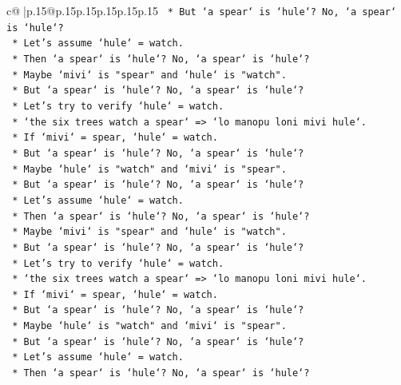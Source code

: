 \documentclass{article}
\begin{document}
{\begin{supertabular}{c@{$\;$}|p{.15\linewidth}@{}p{.15\linewidth}p{.15\linewidth}p{.15\linewidth}p{.15\linewidth}p{.15\linewidth}}
{{{\texttt{                *   But `a spear` is `hule`? No, `a spear` is `hule`?} \\
\texttt{                *   Let's assume `hule` = watch.} \\
\texttt{                *   Then `a spear` is `hule`? No, `a spear` is `hule`?} \\
\texttt{                *   Maybe `mivi` is "spear" and `hule` is "watch".} \\
\texttt{                *   But `a spear` is `hule`? No, `a spear` is `hule`?} \\
\texttt{                *   Let's try to verify `hule` = watch.} \\
\texttt{                *   `the six trees watch a spear` => `lo manopu loni mivi hule`.} \\
\texttt{                *   If `mivi` = spear, `hule` = watch.} \\
\texttt{                *   But `a spear` is `hule`? No, `a spear` is `hule`?} \\
\texttt{                *   Maybe `hule` is "watch" and `mivi` is "spear".} \\
\texttt{                *   But `a spear` is `hule`? No, `a spear` is `hule`?} \\
\texttt{                *   Let's assume `hule` = watch.} \\
\texttt{                *   Then `a spear` is `hule`? No, `a spear` is `hule`?} \\
\texttt{                *   Maybe `mivi` is "spear" and `hule` is "watch".} \\
\texttt{                *   But `a spear` is `hule`? No, `a spear` is `hule`?} \\
\texttt{                *   Let's try to verify `hule` = watch.} \\
\texttt{                *   `the six trees watch a spear` => `lo manopu loni mivi hule`.} \\
\texttt{                *   If `mivi` = spear, `hule` = watch.} \\
\texttt{                *   But `a spear` is `hule`? No, `a spear` is `hule`?} \\
\texttt{                *   Maybe `hule` is "watch" and `mivi` is "spear".} \\
\texttt{                *   But `a spear` is `hule`? No, `a spear` is `hule`?} \\
\texttt{                *   Let's assume `hule` = watch.} \\
\texttt{                *   Then `a spear` is `hule`? No, `a spear` is `hule`?} \\
}}}
\end{supertabular}}
\end{document}
